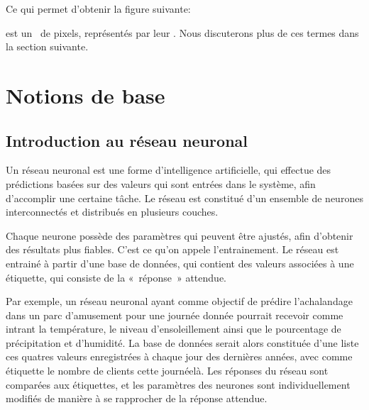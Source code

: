 \documentclass[letterpaper,10pt,french]{sphinxmanual}
\begin{document}
Ce qui permet d’obtenir la figure suivante:


 est un  de pixels, représentés par leur . Nous discuterons plus de ces termes dans la section suivante.




\section{Notions de base}
\label{\detokenize{OCR_SAM:notions-de-base}}\label{\detokenize{OCR_SAM::doc}}

\subsection{Introduction au réseau neuronal}
\label{\detokenize{OCR_SAM:introduction-au-reseau-neuronal}}
Un réseau neuronal est une forme d’intelligence artificielle, qui effectue des prédictions basées sur des valeurs qui sont entrées dans le système, afin d’accomplir une certaine tâche. Le réseau est constitué d’un ensemble de neurones interconnectés et distribués en plusieurs couches.

Chaque neurone possède des paramètres qui peuvent être ajustés, afin d’obtenir des résultats plus fiables. C’est ce qu’on appele l’entrainement.
Le réseau est entrainé à partir d’une base de données, qui contient des valeurs associées à une étiquette, qui consiste de la « réponse » attendue.

Par exemple, un réseau neuronal ayant comme objectif de prédire l’achalandage dans un parc d’amusement pour une journée donnée pourrait recevoir comme intrant la température, le niveau d’ensoleillement ainsi que le pourcentage de précipitation et d’humidité. La base de données serait alors constituée d’une liste ces quatres valeurs enregistrées à chaque jour des dernières années, avec comme étiquette le nombre de clients cette journée\sphinxhyphen{}là. Les réponses du réseau sont comparées aux étiquettes, et les paramètres des neurones sont individuellement modifiés de manière à se rapprocher de la réponse attendue.


\end{document}

